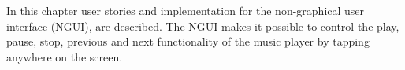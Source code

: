 In this chapter user stories and implementation for the non-graphical user interface (NGUI), are described. The NGUI makes it possible to control the play, pause, stop, previous and next functionality of the music player by tapping anywhere on the screen.

